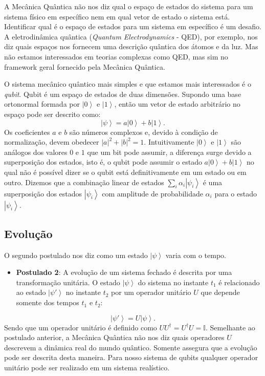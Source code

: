 A Mecânica Quântica não nos diz qual o espaço de estados do sistema para um sistema físico em específico nem em qual vetor de estado o sistema está. Identificar qual é o espaço de estados para um sistema em específico é um desafio. A eletrodinâmica quântica (\textit{Quantum Electrodynamics} - QED), por exemplo, nos diz quais espaços nos fornecem uma descrição quântica dos átomos e da luz. Mas não estamos interessados em teorias complexas como QED, mas sim no framework geral fornecido pela Mecânica Quântica.

O sistema mecânico quântico mais simples e que estamos mais interessados é o \textit{qubit}. Qubit é um espaço de estados de duas dimensões. Supondo uma base ortonormal formada por $\left|0\right\rangle $ e $\left|1\right\rangle $, então um vetor de estado arbitrário no espaço pode ser descrito como: 
\begin{equation}\left|\psi\right\rangle =a\left|0\right\rangle +b\left|1\right\rangle . \end{equation}
Os coeficientes $a$ e $b$ são números complexos e, devido à condição de normalização, devem obedecer $\left|a\right|^{2}+\left|b\right|^{2}=1$.  Intuitivamente $\left|0\right\rangle $ e $\left|1\right\rangle $ são análogos dos valores $0$ e $1$ que um bit pode assumir, a diferença surge devido a superposição dos estados, isto é, o qubit pode assumir o estado $a \left|0\right\rangle + b \left|1\right\rangle $  no qual não é possível dizer se o qubit está definitivamente em um estado ou em outro. Dizemos que a combinação linear de estados  $\sum_{i}\alpha_{i}\left|\psi_{i}\right\rangle $ é uma  superposição dos estados $\left|\psi_{i}\right\rangle $ com amplitude de probabilidade $\alpha_{i}$ para o estado $\left|\psi_{i}\right\rangle $.

\subsection{Evolução}

O segundo postulado nos diz como um estado $\left|\psi\right\rangle $ varia com o tempo.
\begin{itemize}
\item \textbf{Postulado 2}: A evolução de um sistema fechado é descrita por uma transformação unitária. O estado $\left|\psi\right\rangle $ do sistema no instante $t_{1}$ é relacionado ao estado $\left|\psi'\right\rangle $ no instante $t_{2}$ por um operador unitário $U$ que depende somente dos tempos $t_{1}$ e $t_{2}$:
\end{itemize}
\begin{equation}
\left|\psi'\right\rangle =U\left|\psi\right\rangle 
. \end{equation}
Sendo que um operador unitário é definido como $UU^\dagger=U^\dagger U=\mathbb{I}$. Semelhante ao postulado anterior, a Mecânica Quântica não nos diz quais operadores $U$ descrevem a dinâmica real do mundo quântico. Somente assegura que a evolução pode ser descrita desta maneira.  Para nosso sistema de qubits qualquer operador unitário pode ser realizado em um sistema realístico.

